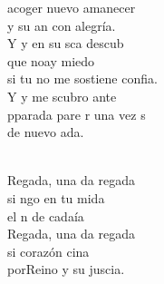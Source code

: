 \documentclass[12pt]{article}
\begin{document}
\begin{multicols*}{2}
\begin{cancion}[Regalada][Ixcís]
	acoger nuevo amanecer\\
	y su an con alegría. \\
\jump
	Y y en su sca descub\\
	que noay miedo\\
	si tu no me sostiene confia.\\
	Y y me scubro ante\\
	pparada pare r una vez s \\
	de nuevo ada.\\\jump\\
	\begin{chorus}%
	Regada, una da regada\\
	si ngo en tu mida \\
	el n de cadaía\\
	Regada, una da regada\\
	si  corazón cina \\
	porReino y su juscia.\\
	\end{chorus}%
	\jump\\
\end{cancion}%


\end{multicols*}
\end{document}
